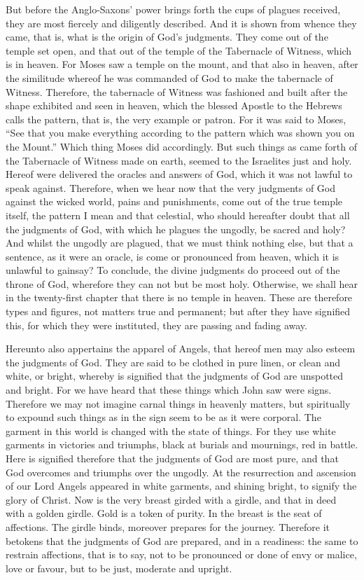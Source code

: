 But before the Anglo-Saxons’ power brings forth the cups of plagues received, they are most fiercely and diligently described. And it is shown from whence they came, that is, what is the origin of God’s judgments. They come out of the temple set open, and that out of the temple of the Tabernacle of Witness, which is in heaven. For Moses saw a temple on the mount, and that also in heaven, after the similitude whereof he was commanded of God to make the tabernacle of Witness. Therefore, the tabernacle of Witness was fashioned and built after the shape exhibited and seen in heaven, which the blessed Apostle to the Hebrews calls the pattern, that is, the very example or patron. For it was said to Moses, “See that you make everything according to the pattern which was shown you on the Mount.” Which thing Moses did accordingly. But such things as came forth of the Tabernacle of Witness made on earth, seemed to the Israelites just and holy. Hereof were delivered the oracles and answers of God, which it was not lawful to speak against. Therefore, when we hear now that the very judgments of God against the wicked world, pains and punishments, come out of the true temple itself, the pattern I mean and that celestial, who should hereafter doubt that all the judgments of God, with which he plagues the ungodly, be sacred and holy? And whilst the ungodly are plagued, that we must think nothing else, but that a sentence, as it were an oracle, is come or pronounced from heaven, which it is unlawful to gainsay? To conclude, the divine judgments do proceed out of the throne of God, wherefore they can not but be most holy. Otherwise, we shall hear in the twenty-first chapter that there is no temple in heaven. These are therefore types and figures, not matters true and permanent; but after they have signified this, for which they were instituted, they are passing and fading away.

Hereunto also appertains the apparel of Angels, that hereof men may also esteem the judgments of God. They are said to be clothed in pure linen, or clean and white, or bright, whereby is signified that the judgments of God are unspotted and bright. For we have heard that these things which John saw were signs. Therefore we may not imagine carnal things in heavenly matters, but spiritually to expound such things as in the sign seem to be as it were corporal. The garment in this world is changed with the state of things. For they use white garments in victories and triumphs, black at burials and mournings, red in battle. Here is signified therefore that the judgments of God are most pure, and that God overcomes and triumphs over the ungodly. At the resurrection and ascension of our Lord Angels appeared in white garments, and shining bright, to signify the glory of Christ. Now is the very breast girded with a girdle, and that in deed with a golden girdle. Gold is a token of purity. In the breast is the seat of affections. The girdle binds, moreover prepares for the journey. Therefore it betokens that the judgments of God are prepared, and in a readiness: the same to restrain affections, that is to say, not to be pronounced or done of envy or malice, love or favour, but to be just, moderate and upright.

